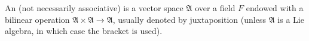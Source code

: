 An  (not necessarily associative) is a vector space $\mathfrak{A}$ over a field $F$ endowed with a bilinear operation $\mathfrak{A} \times \mathfrak{A} \to \mathfrak{A}$, usually denoted by juxtaposition (unless $\mathfrak{A}$ is a Lie algebra, in which case the bracket is used).
